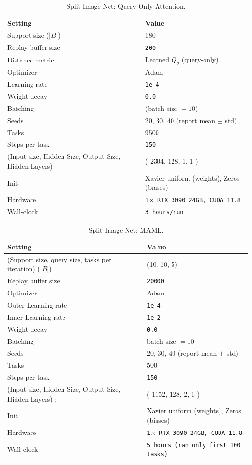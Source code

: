 \documentclass{article}
\begin{document}
\begin{table}[H]
\centering
\footnotesize
\caption{Split Image Net: Query-Only Attention.}
\label{tab:split_image_net_query_only_attention_v1}
\begin{tabular}{@{}ll@{}}
\toprule
Setting & Value \\ \midrule
Support size ($|B|$) & 180 \\
Replay buffer size & \texttt{200} \\
Distance metric & Learned $Q_{\theta}$ (query-only) \\
Optimizer & Adam \\
Learning rate & \texttt{1e-4} \\
Weight decay & \texttt{0.0} \\
Batching & (batch size $=10$) \\
Seeds & 20, 30, 40 (report mean $\pm$ std) \\
Tasks & 9500 \\
Steps per task & \texttt{150} \\
(Input size, Hidden Size, Output Size, Hidden Layers) & ( 2304, 128, 1, 1 ) \\ 
Init & Xavier uniform (weights), Zeros (biases) \\
Hardware & \texttt{1$\times$ RTX 3090 24GB, CUDA 11.8} \\
Wall-clock & \texttt{3 hours/run} \\
\bottomrule
\end{tabular}
\end{table}

\begin{table}[H]
\centering
\footnotesize
\caption{Split Image Net: MAML.}
\label{tab:split_image_net_maml}
\begin{tabular}{@{}ll@{}}
\toprule
Setting & Value \\ \midrule
(Support size, query size, tasks per iteration) ($|B|$) & (10, 10, 5) \\
Replay buffer size & \texttt{20000} \\
Optimizer & Adam \\
Outer Learning rate & \texttt{1e-4} \\
Inner Learning rate & \texttt{1e-2} \\
Weight decay & \texttt{0.0} \\
Batching & batch size $=10$ \\
Seeds & 20, 30, 40 (report mean $\pm$ std) \\
Tasks & 500 \\
Steps per task & \texttt{150} \\
(Input size, Hidden Size, Output Size, Hidden Layers) : & ( 1152, 128, 2, 1 ) \\ 
Init & Xavier uniform (weights), Zeros (biases) \\
Hardware & \texttt{1$\times$ RTX 3090 24GB, CUDA 11.8} \\
Wall-clock & \texttt{5 hours (ran only first 100 tasks)} \\
\bottomrule
\end{tabular}
\end{table}
\end{document}
